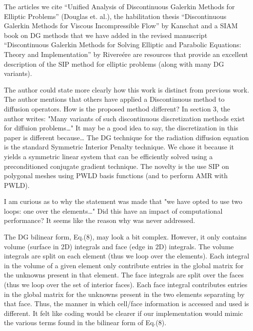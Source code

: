 \documentclass{article}
\begin{document}
The articles we cite ``Unified Analysis of Discontinuous Galerkin Methods for Elliptic Problems'' (Douglas et. al.),
the habilitation thesis ``Discontinuous Galerkin Methods for Viscous Incompressible Flow'' by Kanschat and a SIAM book on DG 
methods that we have added in the revised manuscript ``Discontinuous Galerkin Methods for Solving Elliptic and Parabolic Equations: Theory and Implementation'' by Rivere\'ere are resources that provide an excellent description of the SIP method for elliptic problems (along with many DG variants). 
\bigskip

{
\color{blue}
The author could state more clearly how this work is distinct from previous work. The author mentions
that others have applied a Discontinuous method to diffusion operators. How is the proposed method
different? In section 3, the author writes: "Many variants of such discontinuous discretization methods
exist for diffuion problems…" It may be a good idea to say, the discretization in this paper is different
because…
}
The DG technique for the radiation diffusion equation is the standard Symmetric Interior Penalty technique. 
We chose it because it yields a symmetric linear system that can be efficiently solved using
a preconditioned conjugate gradient technique. The novelty is the use SIP on polygonal meshes using PWLD basis functions
(and to perform  AMR with PWLD).

\bigskip

{
\color{blue}
I am curious as to why the statement was made that "we have opted to use two loops: one over the
elements…" Did this have an impact of computational performance? It seems like the reason why was never
addressed.
}

The DG bilinear form, Eq.(8), may look a bit complex. However, it only contains volume (surface in 2D) integrals 
and face (edge in 2D) integrals. The volume integrals are split on each element (thus we loop over the elements). 
Each integral in the volume of a given element only contribute entries in the global matrix for the unknowns present 
in that element. The face integrals are split over the faces (thus we loop over the set of interior faces). Each face integral
contributes entries in the global matrix for the  unknowns present in the two elements separating by that face. 
Thus, the manner in which cell/face information is accessed and used is different. It felt like coding would be clearer if  our implementation would mimic the various terms found in the bilinear form of Eq.(8).

\bigskip
\end{document}
